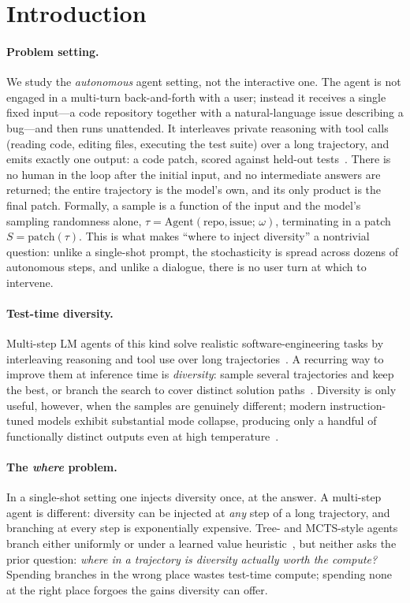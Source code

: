\documentclass[11pt]{article}
\begin{document}
\section{Introduction}

\paragraph{Problem setting.}
We study the \emph{autonomous} agent setting, not the interactive one. The agent
is not engaged in a multi-turn back-and-forth with a user; instead it receives a
single fixed input---a code repository together with a natural-language issue
describing a bug---and then runs unattended. It interleaves private reasoning with
tool calls (reading code, editing files, executing the test suite) over a long
trajectory, and emits exactly one output: a code patch, scored against held-out
tests~\citep{jimenez2024swebench,yang2024sweagent}. There is no human in the loop
after the initial input, and no intermediate answers are returned; the entire
trajectory is the model's own, and its only product is the final patch. Formally,
a sample is a function of the input and the model's sampling randomness alone,
$\tau=\text{Agent}(\text{repo},\text{issue};\,\omega)$, terminating in a patch
$S=\text{patch}(\tau)$. This is what makes ``where to inject diversity'' a
nontrivial question: unlike a single-shot prompt, the stochasticity is spread
across dozens of autonomous steps, and unlike a dialogue, there is no user turn at
which to intervene.

\paragraph{Test-time diversity.}
Multi-step LM agents of this kind solve realistic software-engineering tasks by
interleaving reasoning and tool use over long
trajectories~\citep{yao2023react,yang2024sweagent,jimenez2024swebench}. A
recurring way to improve them at inference time is \emph{diversity}: sample
several trajectories and keep the best, or branch the search to cover distinct
solution paths~\citep{wang2023selfconsistency,yao2023tot,zhou2023lats,snell2024scaling}.
Diversity is only useful, however, when the samples are genuinely different;
modern instruction-tuned models exhibit substantial mode collapse, producing only
a handful of functionally distinct outputs even at high
temperature~\citep{zhang2025noveltybench}.

\paragraph{The \emph{where} problem.}
In a single-shot setting one injects diversity once, at the answer. A multi-step
agent is different: diversity can be injected at \emph{any} step of a long
trajectory, and branching at every step is exponentially expensive. Tree- and
MCTS-style agents branch either uniformly or under a learned value
heuristic~\citep{yao2023tot,zhou2023lats}, but neither asks the prior question:
\emph{where in a trajectory is diversity actually worth the compute?} Spending
branches in the wrong place wastes test-time compute; spending none at the right
place forgoes the gains diversity can offer.
\end{document}
